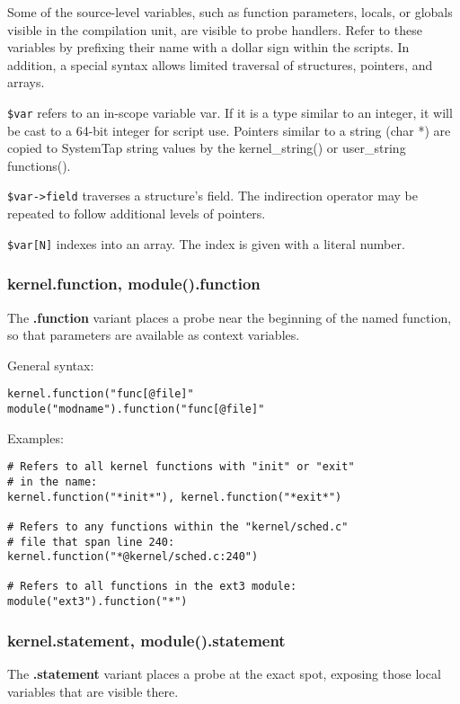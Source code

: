 \documentclass[twoside,english]{article}
\newenvironment{vindent}
{\begin{list}{}{\setlength{\listparindent}{6pt}}
\item[]}
{\end{list}}
\begin{document}
Some of the source-level variables, such as function parameters, locals,
or globals visible in the compilation unit, are visible to probe handlers.
Refer to these variables by prefixing their name with a dollar sign within
the scripts. In addition, a special syntax allows limited traversal of structures,
pointers, and arrays.

\texttt{\$var} refers to an in-scope variable var. If it is a type similar
to an integer, it will be cast to a 64-bit integer for script use. Pointers
similar to a string (char {*}) are copied to SystemTap string values by the
kernel\_string() or user\_string functions().

\texttt{\$var->field} traverses a structure's field. The indirection operator
may be repeated to follow additional levels of pointers.

\texttt{\$var{[}N]} indexes into an array. The index is given with a literal
number.

\subsubsection{kernel.function, module().function}
The \textbf{.function} variant places a probe near the beginning of the named function,
so that parameters are available as context variables.

General syntax:

\begin{vindent}
\begin{verbatim}
kernel.function("func[@file]"
module("modname").function("func[@file]"
\end{verbatim}
\end{vindent}
Examples:

\begin{vindent}
\begin{verbatim}
# Refers to all kernel functions with "init" or "exit"
# in the name:
kernel.function("*init*"), kernel.function("*exit*")

# Refers to any functions within the "kernel/sched.c"
# file that span line 240:
kernel.function("*@kernel/sched.c:240")

# Refers to all functions in the ext3 module:
module("ext3").function("*")
\end{verbatim}
\end{vindent}

\subsubsection{kernel.statement, module().statement}
The \textbf{.statement} variant places a probe at the exact spot, exposing those local
variables that are visible there.
\end{document}
